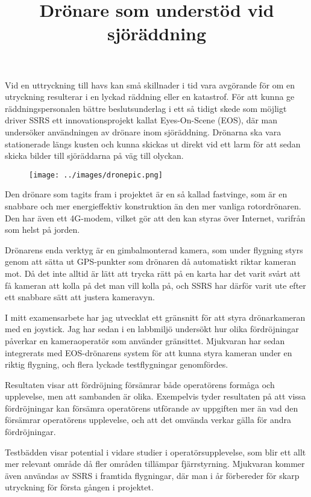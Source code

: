 \documentclass{popsci}
\title{Drönare som understöd vid sjöräddning}
\begin{document}

{\noindent Vid en uttryckning till havs kan små skillnader i tid vara avgörande för om en utryckning resulterar i en lyckad räddning eller en katastrof. För att kunna ge räddningspersonalen bättre beslutsunderlag i ett så tidigt skede som möjligt driver SSRS ett innovationsprojekt kallat Eyes-On-Scene (EOS), där man undersöker användningen av drönare inom sjöräddning. Drönarna ska vara stationerade längs kusten och kunna skickas ut direkt vid ett larm för att sedan skicka bilder till sjöräddarna på väg till olyckan.

\begin{figure}[!bth] %
    \texttt{[image: ../images/dronepic.png]} 
\end{figure}

Den drönare som tagits fram i projektet är en så kallad fastvinge, som är en snabbare och mer energieffektiv konstruktion än den mer vanliga rotordrönaren. Den har även ett 4G-modem, vilket gör att den kan styras över Internet, varifrån som helst på jorden. 

Drönarens enda verktyg är en gimbalmonterad kamera, som under flygning styrs genom att sätta ut GPS-punkter som drönaren då automatiskt riktar kameran mot. Då det inte alltid är lätt att trycka rätt på en karta har det varit svårt att få kameran att kolla på det man vill kolla på, och SSRS har därför varit ute efter ett snabbare sätt att justera kameravyn.

I mitt examensarbete har jag utvecklat ett gränsnitt för att styra drönarkameran med en joystick. Jag har sedan i en labbmiljö undersökt hur olika fördröjningar påverkar en kameraoperatör som använder gränsittet. Mjukvaran har sedan integrerats med EOS-drönarens system för att kunna styra kameran under en riktig flygning, och flera lyckade testflygningar genomfördes. 

Resultaten visar att fördröjning försämrar både operatörens formåga och upplevelse, men att sambanden är olika. Exempelvis tyder resultaten på att vissa fördröjningar kan försämra operatörens utförande av uppgiften mer än vad den försämrar operatörens upplevelse, och att det omvända verkar gälla för andra fördröjningar.

Testbädden visar potential i vidare studier i operatörsupplevelse, som blir ett allt mer relevant område då fler områden tillämpar fjärrstyrning. Mjukvaran kommer även användas av SSRS i framtida flygningar, där man i år förbereder för skarp utryckning för första gången i projektet.
}
\end{document}

